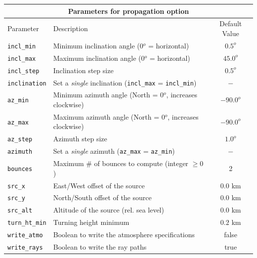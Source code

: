 \documentclass[10pt]{article}
\begin{document}
\begin{tabular}{ | l | l | c | }
  \hline
  \multicolumn{3}{|c|}{\textbf{Parameters for propagation option}} \\
  \hline
  Parameter & Description & Default Value \\
  \hline \hline
 \verb=incl_min= 		& Minimum inclination angle (0\(^o\) = horizontal)				& \(0.5^o\)	\\
 \verb=incl_max= 		& Maximum inclination angle (0\(^o\) = horizontal)				& \(45.0^o\) \\
 \verb=incl_step=  		& Inclination step size									& \(0.5^o\) \\
 \verb=inclination=		& Set a \textit{single} inclination (\verb#incl_max# = \verb#incl_min#)	& \(-\) \\ \hline
 \verb=az_min= 		& Minimum azimuth angle (North = 0\(^o\), increases clockwise)	& \(-90.0^o\)	\\
 \verb=az_max= 		& Maximum azimuth angle (North = 0\(^o\), increases clockwise)	& \(-90.0^o\) \\
 \verb=az_step=  		& Azimuth step size										& \(1.0^o\) \\ 
 \verb=azimuth=		& Set a \textit{single} azimuth  (\verb#az_max# = \verb#az_min#)	& \(-\) \\ \hline
 \verb=bounces=		& Maximum \# of bounces to compute (integer \(\geq 0\)) 			& 2 \\ \hline
 \verb=src_x=  			& East/West offset of the source							& \(0.0\) km \\
 \verb=src_y=  			& North/South offset of the source							& \(0.0\) km \\
 \verb=src_alt=  		& Altitude of the source (rel. sea level)						& \(0.0\) km \\ \hline
 \verb=turn_ht_min=		& Turning height minimum									& \(0.2\) km \\
 \verb=write_atmo=		& Boolean to write the atmosphere specifications				& false \\
 \verb=write_rays=		& Boolean to write the ray paths							& true \\  \hline
 \end{tabular}

\vspace{0.01\textheight}
\end{document}
